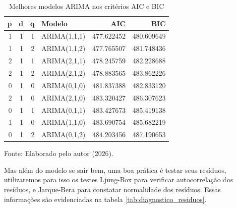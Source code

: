 \begin{table}[htbp]
	\centering
	\captionsetup{justification=centering}
	\caption{Melhores modelos ARIMA nos critérios AIC e BIC}
	\label{tab:melhores_arima}
	\begin{tabular}{rrrlrr}
		\toprule
		p & d & q & Modelo & AIC & BIC \\
		\midrule
		1 & 1 & 1 & ARIMA(1,1,1) & 477.622452 & 480.609649 \\
		1 & 1 & 2 & ARIMA(1,1,2) & 477.765507 & 481.748436 \\
		2 & 1 & 1 & ARIMA(2,1,1) & 478.245759 & 482.228688 \\
		2 & 1 & 2 & ARIMA(2,1,2) & 478.883565 & 483.862226 \\
		0 & 1 & 0 & ARIMA(0,1,0) & 481.837388 & 482.833120 \\
		2 & 1 & 0 & ARIMA(2,1,0) & 483.320427 & 486.307623 \\
		0 & 1 & 1 & ARIMA(0,1,1) & 483.427673 & 485.419138 \\
		1 & 1 & 0 & ARIMA(1,1,0) & 483.690754 & 485.682219 \\
		0 & 1 & 2 & ARIMA(0,1,2) & 484.203456 & 487.190653 \\
		\bottomrule
	\end{tabular}
	
	\vspace{0.1cm}
	
	\centering
	\small Fonte: Elaborado pelo autor (2026).
\end{table}


Mas além do modelo se sair bem, uma boa prática é testar seus resíduos, utilizaremos para isso os testes Ljung-Box para verificar autocorrelação dos resíduos, e Jarque-Bera para constatar normalidade dos resíduos. Essas informações são evidenciadas na tabela \ref{tab:diagnostico_residuos}.


